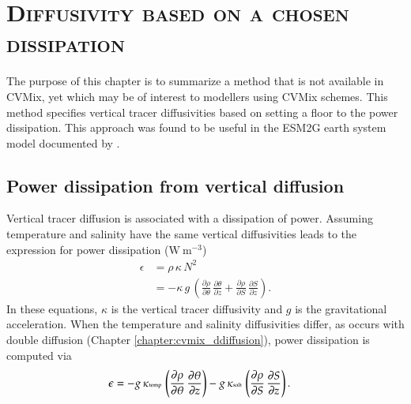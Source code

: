\chapter{\scshape Diffusivity based on a chosen dissipation}
\label{chapter:cvmix_dissipate}

\minitoc
\vspace{.5cm}

The purpose of this chapter is to summarize a method that is not
available in CVMix, yet which may be of interest to modellers using
CVMix schemes.  This method specifies vertical tracer diffusivities
based on setting a floor to the power dissipation.  This approach was
found to be useful in the ESM2G earth system model documented by 
\cite{Dunne_etal_part1_2012}.


\section{Power dissipation from vertical diffusion}
\label{section:vert_dissipation_formulation}

Vertical tracer diffusion is associated with a dissipation of power.
Assuming temperature and salinity have the same vertical diffusivities
leads to the expression for power dissipation
($\mbox{W}~\mbox{m}^{-3}$)
\begin{equation}
\begin{split}
 \epsilon &= \rho \,  \kappa \, N^{2}
 \\
&= -\kappa \, g \, \left( \frac{\partial \rho}{\partial \theta} \, \frac{\partial \theta}{\partial z} 
                                      +\frac{\partial \rho}{\partial S}         \, \frac{\partial S}{\partial z}
                                \right).
\end{split}
\end{equation}
In these equations, $\kappa$ is the vertical tracer diffusivity and
$g$ is the gravitational acceleration. When the temperature and
salinity diffusivities differ, as occurs with double diffusion
(Chapter \ref{chapter:cvmix_ddiffusion}), power dissipation is computed
via
\begin{equation}
\begin{split}
  \epsilon &= 
 -g \, \kappa{\mbox{\tiny temp}} \,  \left( \frac{\partial \rho}{\partial \theta} \, \frac{\partial \theta}{\partial z} \right)
-g\, \kappa{\mbox{\tiny salt}}     \, \left(  \frac{\partial \rho}{\partial S}        \, \frac{\partial S}{\partial z} \right).
\end{split}
\end{equation}


